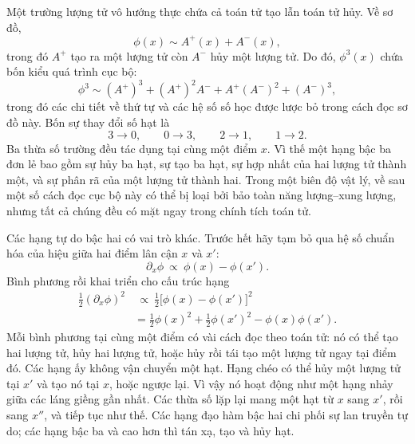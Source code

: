 Một trường lượng tử vô hướng thực chứa cả toán tử tạo lẫn toán tử hủy. Về sơ đồ,
\begin{equation}
\phi(x)\sim A^+(x)+A^-(x),
\end{equation}
trong đó \(A^+\) tạo ra một lượng tử còn \(A^-\) hủy một lượng tử. Do đó, \(\phi^3(x)\) chứa bốn kiểu quá trình cục bộ:
\begin{equation}
\phi^3
\sim
(A^+)^3+(A^+)^2A^-+A^+(A^-)^2+(A^-)^3,
\end{equation}
trong đó các chi tiết về thứ tự và các hệ số số học được lược bỏ trong cách đọc sơ đồ này. Bốn sự thay đổi số hạt là
\begin{equation}
3\longrightarrow0,
\qquad
0\longrightarrow3,
\qquad
2\longrightarrow1,
\qquad
1\longrightarrow2.
\end{equation}
Ba thừa số trường đều tác dụng tại cùng một điểm \(x\). Vì thế một hạng bậc ba đơn lẻ bao gồm sự hủy ba hạt, sự tạo ba hạt, sự hợp nhất của hai lượng tử thành một, và sự phân rã của một lượng tử thành hai. Trong một biên độ vật lý, về sau một số cách đọc cục bộ này có thể bị loại bởi bảo toàn năng lượng--xung lượng, nhưng tất cả chúng đều có mặt ngay trong chính tích toán tử.

Các hạng tự do bậc hai có vai trò khác. Trước hết hãy tạm bỏ qua hệ số chuẩn hóa của hiệu giữa hai điểm lân cận \(x\) và \(x'\):
\begin{equation}
\partial_x\phi
\ \propto\
\phi(x)-\phi(x').
\end{equation}
Bình phương rồi khai triển cho cấu trúc hạng
\begin{align}
\frac12(\partial_x\phi)^2
&\ \propto\
\frac12\bigl[\phi(x)-\phi(x')\bigr]^2
\\
&=
\frac12\phi(x)^2
+\frac12\phi(x')^2
-\phi(x)\phi(x').
\end{align}
Mỗi bình phương tại cùng một điểm có vài cách đọc theo toán tử: nó có thể tạo hai lượng tử, hủy hai lượng tử, hoặc hủy rồi tái tạo một lượng tử ngay tại điểm đó. Các hạng ấy không vận chuyển một hạt. Hạng chéo có thể hủy một lượng tử tại \(x'\) và tạo nó tại \(x\), hoặc ngược lại. Vì vậy nó hoạt động như một hạng nhảy giữa các láng giềng gần nhất. Các thừa số lặp lại mang một hạt từ \(x\) sang \(x'\), rồi sang \(x''\), và tiếp tục như thế. Các hạng đạo hàm bậc hai chi phối sự lan truyền tự do; các hạng bậc ba và cao hơn thì tán xạ, tạo và hủy hạt.

\begin{classroomqa}
\end{classroomqa}


